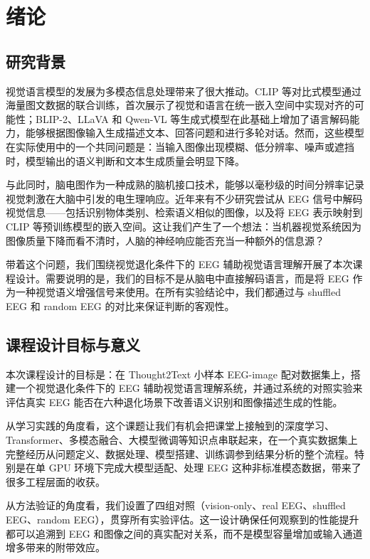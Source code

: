 \section{绪论}

\subsection{研究背景}

视觉语言模型的发展为多模态信息处理带来了很大推动。CLIP 等对比式模型通过海量图文数据的联合训练，首次展示了视觉和语言在统一嵌入空间中实现对齐的可能性；BLIP-2、LLaVA 和 Qwen-VL 等生成式模型在此基础上增加了语言解码能力，能够根据图像输入生成描述文本、回答问题和进行多轮对话。然而，这些模型在实际使用中的一个共同问题是：当输入图像出现模糊、低分辨率、噪声或遮挡时，模型输出的语义判断和文本生成质量会明显下降。

与此同时，脑电图作为一种成熟的脑机接口技术，能够以毫秒级的时间分辨率记录视觉刺激在大脑中引发的电生理响应。近年来有不少研究尝试从 EEG 信号中解码视觉信息——包括识别物体类别、检索语义相似的图像，以及将 EEG 表示映射到 CLIP 等预训练模型的嵌入空间。这让我们产生了一个想法：当机器视觉系统因为图像质量下降而看不清时，人脑的神经响应能否充当一种额外的信息源？

带着这个问题，我们围绕视觉退化条件下的 EEG 辅助视觉语言理解开展了本次课程设计。需要说明的是，我们的目标不是从脑电中直接解码语言，而是将 EEG 作为一种视觉语义增强信号来使用。在所有实验结论中，我们都通过与 shuffled EEG 和 random EEG 的对比来保证判断的客观性。

\subsection{课程设计目标与意义}

本次课程设计的目标是：在 Thought2Text 小样本 EEG-image 配对数据集上，搭建一个视觉退化条件下的 EEG 辅助视觉语言理解系统，并通过系统的对照实验来评估真实 EEG 能否在六种退化场景下改善语义识别和图像描述生成的性能。

从学习实践的角度看，这个课题让我们有机会把课堂上接触到的深度学习、Transformer、多模态融合、大模型微调等知识点串联起来，在一个真实数据集上完整经历从问题定义、数据处理、模型搭建、训练调参到结果分析的整个流程。特别是在单 GPU 环境下完成大模型适配、处理 EEG 这种非标准模态数据，带来了很多工程层面的收获。

从方法验证的角度看，我们设置了四组对照（vision-only、real EEG、shuffled EEG、random EEG），贯穿所有实验评估。这一设计确保任何观察到的性能提升都可以追溯到 EEG 和图像之间的真实配对关系，而不是模型容量增加或输入通道增多带来的附带效应。

